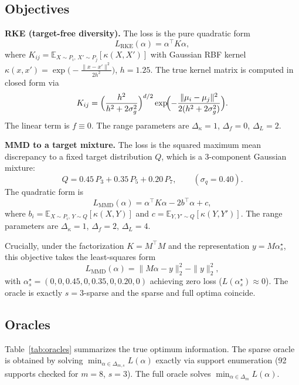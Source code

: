 \documentclass[11pt]{article}
\newcommand{\E}{\mathbb{E}}
\newcommand{\1}{\mathbf{1}}
\begin{document}
\subsection{Objectives}

\textbf{RKE (target-free diversity).} The loss is the pure quadratic form
\[
L_{\mathrm{RKE}}(\alpha) = \alpha^\top K \alpha,
\]
where $K_{ij} = \E_{X\sim P_i,\,X'\sim P_j}[\kappa(X,X')]$ with Gaussian RBF kernel $\kappa(x,x') = \exp\bigl(-\frac{\|x-x'\|^2}{2h^2}\bigr)$, $h=1.25$. The true kernel matrix is computed in closed form via
\[
K_{ij} = \Bigl(\frac{h^2}{h^2+2\sigma_g^2}\Bigr)^{d/2} \exp\!\Bigl(-\frac{\|\mu_i-\mu_j\|^2}{2(h^2+2\sigma_g^2)}\Bigr).
\]
The linear term is $f \equiv 0$. The range parameters are $\Delta_\kappa=1$, $\Delta_f=0$, $\Delta_L=2$.

\textbf{MMD to a target mixture.} The loss is the squared maximum mean discrepancy to a fixed target distribution $Q$, which is a 3-component Gaussian mixture:
\[
Q = 0.45\,P_3 + 0.35\,P_5 + 0.20\,P_7,
\qquad (\sigma_q=0.40).
\]
The quadratic form is
\[
L_{\mathrm{MMD}}(\alpha) = \alpha^\top K\alpha - 2b^\top\alpha + c,
\]
where $b_i = \E_{X\sim P_i,\,Y\sim Q}[\kappa(X,Y)]$ and $c = \E_{Y,Y'\sim Q}[\kappa(Y,Y')]$. The range parameters are $\Delta_\kappa=1$, $\Delta_f=2$, $\Delta_L=4$.

Crucially, under the factorization $K = M^\top M$ and the representation $y = M\alpha_s^\star$, this objective takes the least-squares form
\[
L_{\mathrm{MMD}}(\alpha) = \|M\alpha - y\|_2^2 - \|y\|_2^2,
\]
with $\alpha_s^\star = (0,0,0.45,0,0.35,0,0.20,0)$ achieving zero loss ($L(\alpha_s^\star) \approx 0$). The oracle is exactly $s=3$-sparse and the sparse and full optima coincide.

\subsection{Oracles}

Table~\ref{tab:oracles} summarizes the true optimum information. The sparse oracle is obtained by solving $\min_{\alpha\in\Delta_{m,s}} L(\alpha)$ exactly via support enumeration (92 supports checked for $m=8$, $s=3$). The full oracle solves $\min_{\alpha\in\Delta_m} L(\alpha)$.
\end{document}
